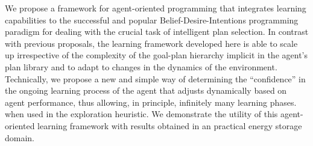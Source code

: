 


We propose a framework for agent-oriented programming that integrates learning capabilities to the successful and popular Belief-Desire-Intentions programming paradigm for dealing with the crucial task of intelligent plan selection.
In contrast with previous proposals, the learning framework developed here is able to scale up irrespective of the complexity of the goal-plan hierarchy implicit in the agent's plan library and to adapt to changes in the dynamics of the environment.
Technically, we propose a new and simple way of determining the ``confidence'' in the ongoing learning process of the agent that adjusts dynamically based on agent performance, thus allowing, in principle, infinitely many learning phases. when used in the exploration heuristic. 
%
We demonstrate the utility of this agent-oriented learning framework with results obtained in an practical energy storage domain.


% 
% 
% 
